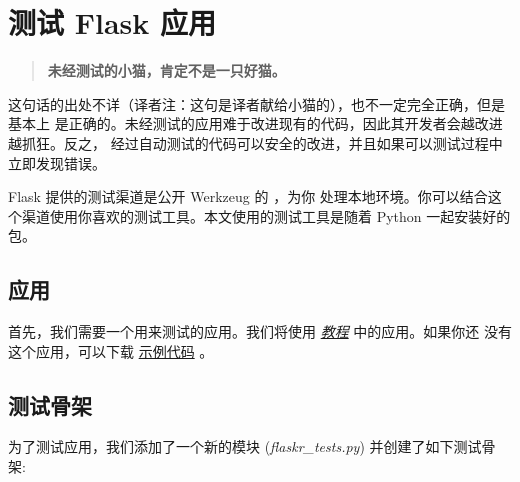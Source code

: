 \documentclass[a4paper,12pt]{sphinxmanual}
\begin{document}
\chapter{测试 Flask 应用}
\label{testing:flask}\label{testing:testing}\label{testing::doc}\begin{quote}

\textbf{未经测试的小猫，肯定不是一只好猫。}
\end{quote}

这句话的出处不详（译者注：这句是译者献给小猫的），也不一定完全正确，但是基本上
是正确的。未经测试的应用难于改进现有的代码，因此其开发者会越改进越抓狂。反之，
经过自动测试的代码可以安全的改进，并且如果可以测试过程中立即发现错误。

Flask 提供的测试渠道是公开 Werkzeug 的 \href{http://werkzeug.pocoo.org/docs/test/\#werkzeug.test.Client}{} ，为你
处理本地环境。你可以结合这个渠道使用你喜欢的测试工具。本文使用的测试工具是随着
Python 一起安装好的 \href{http://docs.python.org/dev/library/unittest.html\#unittest}{} 包。


\section{应用}
\label{testing:id1}
首先，我们需要一个用来测试的应用。我们将使用 {\hyperref[tutorial/index:tutorial]{\emph{教程}}} 中的应用。如果你还
没有这个应用，可以下载 \href{http://github.com/mitsuhiko/flask/tree/master/examples/flaskr/}{示例代码} 。


\section{测试骨架}
\label{testing:id2}\label{testing:id3}
为了测试应用，我们添加了一个新的模块 (\emph{flaskr\_tests.py}) 并创建了如下测试骨架:
\end{document}

